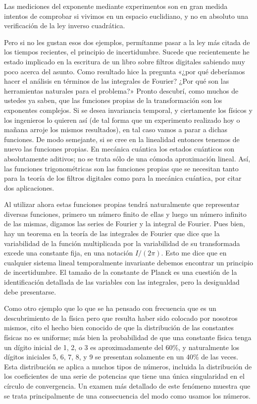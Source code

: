 \documentclass[a4paper, 12pt]{article}
\begin{document}
 

Las mediciones del exponente mediante experimentos son en gran medida intentos de comprobar si vivimos en un espacio euclidiano, y no en absoluto una verificación de la ley inverso cuadrática.

 

Pero si no les gustan esos dos ejemplos, permítanme pasar a la ley más citada de los tiempos recientes, el principio de incertidumbre. Sucede que recientemente he estado implicado en la escritura de un libro sobre filtros digitales  sabiendo muy poco acerca del asunto. Como resultado hice la pregunta «¿por qué deberíamos hacer el análisis en términos de las integrales de Fourier? ¿Por qué son las herramientas naturales para el problema?» Pronto descubrí, como muchos de ustedes ya saben, que las funciones propias de la transformación son los exponentes complejos. Si se desea invariancia temporal, y ciertamente los físicos y los ingenieros lo quieren así (de tal forma que un experimento realizado hoy o mañana arroje los mismos resultados), en tal caso vamos a parar a dichas funciones. De modo semejante, si se cree en la linealidad entonces tenemos de nuevo las funciones propias. En mecánica cuántica los estados cuánticos son absolutamente aditivos; no se trata sólo de una cómoda aproximación lineal. Así, las funciones trigonométricas son las funciones propias que se necesitan tanto para la teoría de los filtros digitales como para la mecánica cuántica, por citar dos aplicaciones.

Al utilizar ahora estas funciones propias tendrá naturalmente que representar diversas funciones, primero un número finito de ellas y luego un número infinito de las mismas, digamos las series de Fourier y la integral de Fourier. Pues bien, hay un teorema en la teoría de las integrales de Fourier que dice que la variabilidad de la función multiplicada por la variabilidad de su transformada excede una constante fija, en una notación $I/(2 \pi)$. Esto me dice que en cualquier sistema lineal temporalmente invariante debemos encontrar un principio de incertidumbre. El tamaño de la constante de Planck es una cuestión de la identificación detallada de las variables con las integrales, pero la desigualdad debe presentarse.

 

Como otro ejemplo que lo que se ha pensado con frecuencia que es un descubrimiento de la física pero que resulta haber sido colocado por nosotros mismos, cito el hecho bien conocido de que la distribución de las constantes físicas no es uniforme; más bien la probabilidad de que una constante física tenga un dígito inicial de 1, 2, o 3 es aproximadamente del 60\%, y naturalmente los dígitos iniciales 5, 6, 7, 8, y 9 se presentan solamente en un 40\% de las veces. Esta distribución se aplica a muchos tipos de números, incluida la distribución de los coeficientes de una serie de potencias que tiene una única singularidad en el círculo de convergencia. Un examen más detallado de este fenómeno muestra que se trata principalmente de una consecuencia del modo como usamos los números.
\end{document}
